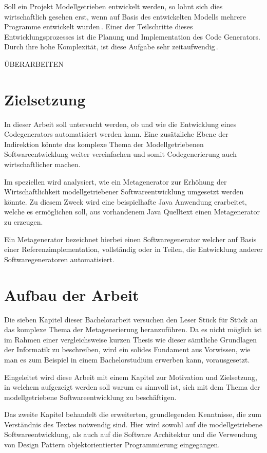 \documentclass[12pt,oneside,a4paper,parskip]{scrbook}
\begin{document}
Soll ein Projekt Modellgetrieben entwickelt werden, so lohnt sich dies wirtschaftlich gesehen erst, wenn auf Basis des entwickelten Modells mehrere Programme entwickelt wurden\,\cite{}. Einer der Teilschritte dieses Entwicklungsprozesses ist die Planung und Implementation des Code Generators. Durch ihre hohe Komplexität, ist diese Aufgabe sehr zeitaufwendig\,\cite{}.

ÜBERARBEITEN
\section{Zielsetzung}

In dieser Arbeit soll untersucht werden, ob und wie die Entwicklung eines Codegenerators automatisiert werden kann. Eine zusätzliche Ebene der Indirektion könnte das komplexe Thema der Modellgetriebenen Softwareentwicklung weiter vereinfachen und somit Codegenerierung auch wirtschaftlicher machen.

Im speziellen wird analysiert, wie ein Metagenerator zur Erhöhung der Wirtschaftlichkeit modellgetriebener Softwareentwicklung umgesetzt werden könnte. Zu diesem Zweck wird eine beispielhafte Java Anwendung erarbeitet, welche es ermöglichen soll, aus vorhandenem Java Quelltext einen Metagenerator zu erzeugen.

Ein Metagenerator bezeichnet hierbei einen Softwaregenerator welcher auf Basis einer Referenzimplementation, vollständig oder in Teilen, die Entwicklung anderer Softwaregeneratoren automatisiert.

\section{Aufbau der Arbeit}

Die sieben Kapitel dieser Bachelorarbeit versuchen den Leser Stück für Stück an das komplexe Thema der Metagenerierung heranzuführen. Da es nicht möglich ist im Rahmen einer vergleichsweise kurzen Thesis wie dieser sämtliche Grundlagen der Informatik zu beschreiben, wird ein solides Fundament aus Vorwissen, wie man es zum Beispiel in einem Bachelorstudium erwerben kann, vorausgesetzt.

Eingeleitet wird diese Arbeit mit einem Kapitel zur Motivation und Zielsetzung, in welchem aufgezeigt werden soll warum es sinnvoll ist, sich mit dem Thema der modellgetriebene Softwareentwicklung zu beschäftigen. 

Das zweite Kapitel behandelt die erweiterten, grundlegenden Kenntnisse, die zum Verständnis des Textes notwendig sind. Hier wird sowohl auf die modellgetriebene Softwareentwicklung, als auch auf die Software Architektur und die Verwendung von Design Pattern objektorientierter Programmierung eingegangen.
\end{document}
